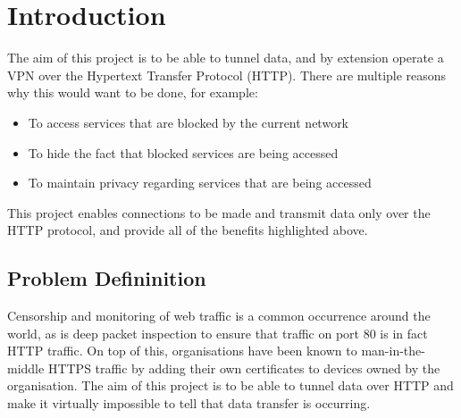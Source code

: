 \section{Introduction}
The aim of this project is to be able to tunnel data, and by extension operate a VPN over the Hypertext Transfer Protocol (HTTP). There are multiple reasons why this would want to be done, for example:
\begin{itemize}
    \item To access services that are blocked by the current network
    \item To hide the fact that blocked services are being accessed
    \item To maintain privacy regarding services that are being accessed
\end{itemize}

This project enables connections to be made and transmit data only over the HTTP protocol, and provide all of the benefits highlighted above.

\subsection{Problem Defininition}
Censorship and monitoring of web traffic is a common occurrence around the world, as is deep packet inspection to ensure that traffic on port 80 is in fact HTTP traffic.
On top of this, organisations have been known to man-in-the-middle HTTPS traffic by adding their own certificates to devices owned by the organisation.
The aim of this project is to be able to tunnel data over HTTP and make it virtually impossible to tell that data transfer is occurring.

